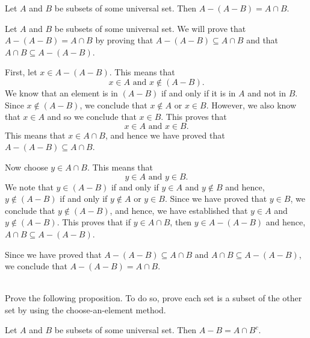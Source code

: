 \begin{proposition} \label{P:setdifference}
Let  $A$  and  $B$  be subsets of some universal set.  Then 
\linebreak $A - (A - B) = A \cap B$.
\end{proposition}
%
\begin{myproof}
Let  $A$  and  $B$  be subsets of some universal set.  We will prove that \linebreak
$A - (A - B) = A \cap B$ by proving that  $A - (A - B) \subseteq A \cap B$  and that  
$A \cap B  \subseteq A - (A - B)$.

First, let  $x \in A - (A - B)$.  This means that
\[
x \in A\text{  and  }x \notin (A - B).
\]
We know that an element is in $(A - B)$ if and only if it is in $A$ and not in $B$.  Since $x \notin (A - B)$, we conclude that $x \notin A$ or $x \in B$.  However, we also know that $x \in A$ and so we conclude that $x \in B$.  This proves that 
\[
x \in A \text{  and  }x \in B.
\]
This means that  $x \in A \cap B$, and hence we have proved that  $A - (A - B) \subseteq A \cap B$.

Now choose  $y \in A \cap B$.  This means that
\[
y \in A\text{  and  }y \in B. 
\]
We note that $y \in (A - B)$ if and only if $y \in A$ and $y \notin B$ and hence, $y \notin (A - B)$ if and only if $y \notin A$ or $y \in B$.  Since we have proved that $y \in B$, we conclude that $y \notin (A - B)$, and hence, we have established that $y \in A$ and $y \notin (A - B)$.  This proves that if $y \in A \cap B$, then $y \in A - (A - B)$ and hence, $A \cap B \subseteq A - (A - B)$.

Since we have proved that  $A - (A - B) \subseteq A \cap B$  and  $A \cap B  \subseteq A - (A - B)$, we conclude that  $A - (A - B) = A \cap B$.
\end{myproof}
\hbreak
%
\begin{prog} \label{prog:setequality2} \hfill \\
Prove the following proposition.  To do so, prove each set is a subset of the other set by using the choose-an-element method.

\begin{proposition} \label{P:setequality}
Let  $A$  and  $B$  be subsets of some universal set.  Then $A - B = A \cap B^c$.
\end{proposition}
\end{prog}
\hbreak

\endinput
